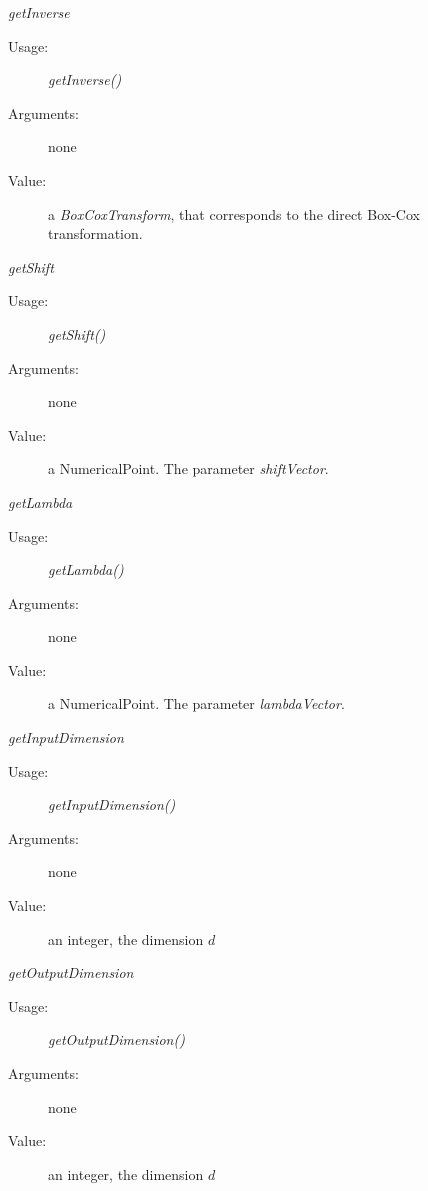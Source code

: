 \begin{description}
\begin{description}
\item \textit{getInverse}
\begin{description}
\item[Usage:] \textit{getInverse()}
\item[Arguments:] none
\item[Value:]   a \textit{BoxCoxTransform}, that corresponds to the direct Box-Cox transformation.
\end{description}
\bigskip


\item \textit{getShift}
\begin{description}
\item[Usage:] \textit{getShift()}
\item[Arguments:] none
\item[Value:]   a NumericalPoint. The parameter \textit{shiftVector}.
\end{description}
\bigskip


\item \textit{getLambda}
\begin{description}
\item[Usage:] \textit{getLambda()}
\item[Arguments:] none
\item[Value:]   a NumericalPoint. The parameter \textit{lambdaVector}.
\end{description}
\bigskip

\item \textit{getInputDimension}
\begin{description}
\item[Usage:] \textit{getInputDimension()}
\item[Arguments:] none
\item[Value:]   an integer, the dimension $d$
\end{description}
\bigskip

\item \textit{getOutputDimension}
\begin{description}
\item[Usage:] \textit{getOutputDimension()}
\item[Arguments:] none
\item[Value:]   an integer, the dimension $d$
\end{description}


\end{description}

\end{description}

